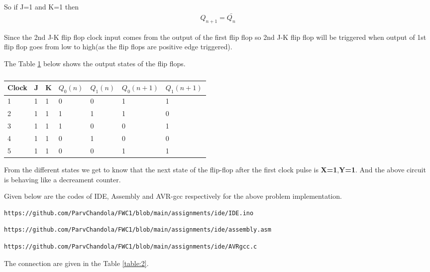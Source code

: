 \documentclass[journal,12pt,twocolumn]{IEEEtran}
\begin{document}
So if J=1 and K=1 then
\begin{align}
Q_{n+1} = \bar{Q_{n}}
\end{align}

Since the 2nd J-K flip flop clock input comes from the output of the first flip flop so 2nd J-K flip flop will be triggered when output of 1st flip flop goes from low to high(as the flip flops are positive edge triggered).

The Table \ref{table:1} below shows the output states of the flip flops.

\begin{table}[h!]
\begin{center}
\begin{tabular}{ | m{2em} |m{0.5cm}|m{0.5cm}| m{0.8cm}| m{0.8cm} |m{1.5cm} |m{1.5cm} | } 
  \hline
  \textbf{Clock}& J &K &{$Q_{0}(n)$} & {$Q_{1}(n)$}&{$Q_{0}(n+1)$}&{$Q_{1}(n+1)$} \\ 
  \hline
  1 &1 &1 & 0 & 0& 1& 1 \\ 
  \hline
  2 & 1 &1 &1 & 1& 1& 0 \\ 
  \hline
  3 &1 &1 & 1 & 0 & 0& 1\\
  \hline
  4& 1 &1 &0 & 1 & 0& 0\\
  \hline
  5&1 &1 & 0 & 0 & 1& 1\\
  \hline
\end{tabular}
\caption{}
\label{table:1}
\end{center}
\end{table}

From the different states we get to know that the next state of the flip-flop after the first clock pulse is 
\textbf{X=1},\textbf{Y=1}. And the above circuit is behaving like a decreament counter.


Given below are the codes of IDE, Assembly and AVR-gcc respectively for the above problem implementation.

\begin{lstlisting}
https://github.com/ParvChandola/FWC1/blob/main/assignments/ide/IDE.ino
\end{lstlisting}

\begin{lstlisting}
https://github.com/ParvChandola/FWC1/blob/main/assignments/ide/assembly.asm
\end{lstlisting}

\begin{lstlisting}
https://github.com/ParvChandola/FWC1/blob/main/assignments/ide/AVRgcc.c
\end{lstlisting}
The connection are given in the Table \ref{table:2}.
\end{document}
